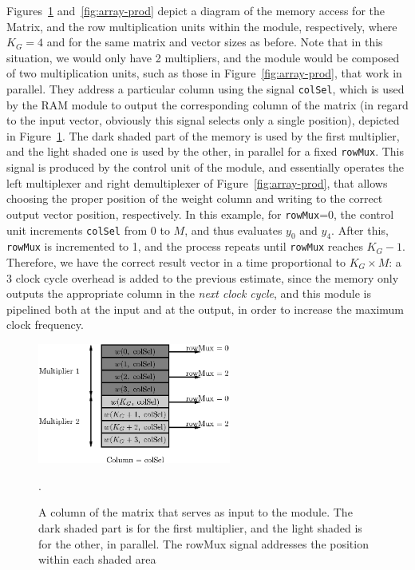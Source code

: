 \documentclass{IEEEtran}
\begin{document}
Figures~\ref{fig:mem-arrayprod} and~\ref{fig:array-prod} depict a diagram of the memory access for the Matrix, and the row multiplication
units within the module, respectively, where $K_G = 4$ and for the same matrix and vector sizes as before. Note that in this situation,
we would only have 2 multipliers, and the module would be composed of two multiplication units, such as those in Figure~\ref{fig:array-prod},
that work in parallel. They address a particular column using the signal \verb+colSel+, which is used by the RAM module to output the corresponding
column of the matrix (in regard to the input vector, obviously this signal selects only a single position), depicted in Figure~\ref{fig:mem-arrayprod}.
The dark shaded part of the memory is used by the first multiplier, and the light shaded one is used by the other, in parallel for a
fixed \verb+rowMux+. This signal is produced by the control unit of the module, and essentially operates the left multiplexer and right demultiplexer
of Figure~\ref{fig:array-prod}, that allows choosing the proper position of the weight column and writing to the correct output vector position, respectively.
In this example, for \verb+rowMux+=0, the control unit increments \verb+colSel+ from 0 to $M$, and thus evaluates $y_0$ and $y_4$. After this, \verb+rowMux+
is incremented to 1, and the process repeats until \verb+rowMux+ reaches $K_G-1$. Therefore, we have the correct result vector in a time
proportional to $K_G \times M$: a 3 clock cycle overhead is added to the previous estimate, since the memory only outputs the appropriate column
in the \emph{next clock cycle}, and this module is pipelined both at the input and at the output, in order to increase the maximum clock frequency.

\begin{figure}
    \centering
    \includegraphics[width=2.5in]{figures/mem-array-prod.eps}
    \caption{A column of the matrix that serves as input to the module. The dark shaded part is for the first multiplier, and the light shaded is for the other, in parallel. The rowMux signal addresses the position within each shaded area}.
    \label{fig:mem-arrayprod}
\end{figure}
\end{document}
